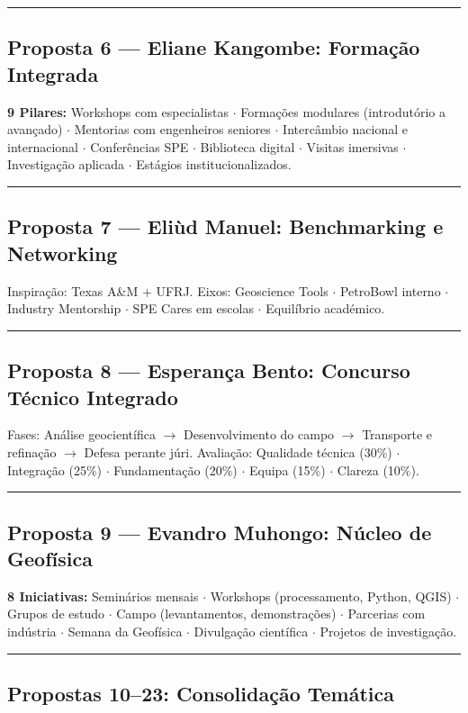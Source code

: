 \documentclass[12pt,a4paper]{article}
\newcommand{\proposalsep}{%
  \vspace{6pt}%
  {\color{gold}\rule{0.35\linewidth}{0.7pt}}%
  \vspace{4pt}%
}
\begin{document}
\proposalsep

\subsection{Proposta 6 — Eliane Kangombe: Formação Integrada}

\textbf{9 Pilares:} Workshops com especialistas $\cdot$ Formações modulares (introdutório a avançado) $\cdot$ Mentorias com engenheiros seniores $\cdot$ Intercâmbio nacional e internacional $\cdot$ Conferências SPE $\cdot$ Biblioteca digital $\cdot$ Visitas imersivas $\cdot$ Investigação aplicada $\cdot$ Estágios institucionalizados.

\proposalsep

\subsection{Proposta 7 — Eliùd Manuel: Benchmarking e Networking}

Inspiração: Texas A\&M + UFRJ. Eixos: Geoscience Tools $\cdot$ PetroBowl interno $\cdot$ Industry Mentorship $\cdot$ SPE Cares em escolas $\cdot$ Equilíbrio académico.

\proposalsep

\subsection{Proposta 8 — Esperança Bento: Concurso Técnico Integrado}

Fases: Análise geocientífica $\rightarrow$ Desenvolvimento do campo $\rightarrow$ Transporte e refinação $\rightarrow$ Defesa perante júri. Avaliação: Qualidade técnica (30\%) $\cdot$ Integração (25\%) $\cdot$ Fundamentação (20\%) $\cdot$ Equipa (15\%) $\cdot$ Clareza (10\%).

\proposalsep

\subsection{Proposta 9 — Evandro Muhongo: Núcleo de Geofísica}

\textbf{8 Iniciativas:} Seminários mensais $\cdot$ Workshops (processamento, Python, QGIS) $\cdot$ Grupos de estudo $\cdot$ Campo (levantamentos, demonstrações) $\cdot$ Parcerias com indústria $\cdot$ Semana da Geofísica $\cdot$ Divulgação científica $\cdot$ Projetos de investigação.

\proposalsep

\subsection{Propostas 10–23: Consolidação Temática}
\end{document}
